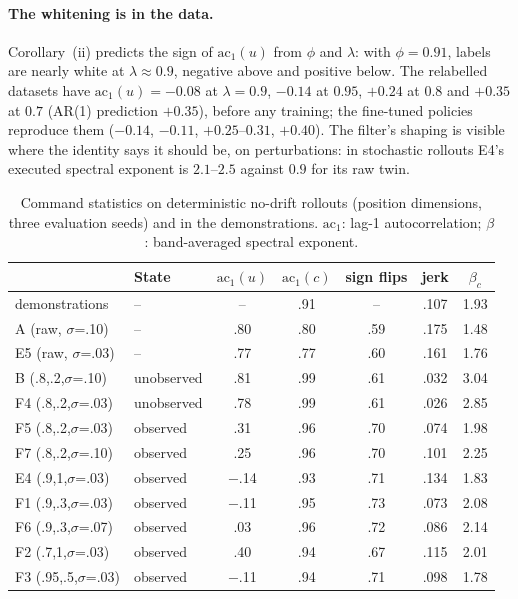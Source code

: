 \documentclass{article}
\begin{document}
\paragraph{The whitening is in the data.} Corollary~(ii) predicts the sign of $\mathrm{ac}_1(u)$ from $\phi$ and $\lambda$: with $\phi=0.91$, labels are nearly white at $\lambda\approx0.9$, negative above and positive below. The relabelled datasets have $\mathrm{ac}_1(u)=-0.08$ at $\lambda=0.9$, $-0.14$ at $0.95$, $+0.24$ at $0.8$ and $+0.35$ at $0.7$ (AR(1) prediction $+0.35$), before any training; the fine-tuned policies reproduce them ($-0.14$, $-0.11$, $+0.25$--$0.31$, $+0.40$). The filter's shaping is visible where the identity says it should be, on perturbations: in stochastic rollouts E4's executed spectral exponent is $2.1$--$2.5$ against $0.9$ for its raw twin.

\begin{table}[t]
\centering
\caption{Command statistics on deterministic no-drift rollouts (position dimensions, three evaluation seeds) and in the demonstrations. $\mathrm{ac}_1$: lag-1 autocorrelation; $\beta$: band-averaged spectral exponent.}
\label{tab:white}
\small
\begin{tabular}{l l cc c c c}
\toprule
& State & $\mathrm{ac}_1(u)$ & $\mathrm{ac}_1(c)$ & sign flips & jerk & $\beta_c$ \\
\midrule
demonstrations & -- & -- & .91 & -- & .107 & 1.93 \\
A (raw, $\sigma$=.10) & -- & .80 & .80 & .59 & .175 & 1.48 \\
E5 (raw, $\sigma$=.03) & -- & .77 & .77 & .60 & .161 & 1.76 \\
B (.8,.2,$\sigma$=.10) & unobserved & .81 & .99 & .61 & .032 & 3.04 \\
F4 (.8,.2,$\sigma$=.03) & unobserved & .78 & .99 & .61 & .026 & 2.85 \\
F5 (.8,.2,$\sigma$=.03) & observed & .31 & .96 & .70 & .074 & 1.98 \\
F7 (.8,.2,$\sigma$=.10) & observed & .25 & .96 & .70 & .101 & 2.25 \\
E4 (.9,1,$\sigma$=.03) & observed & $-$.14 & .93 & .71 & .134 & 1.83 \\
F1 (.9,.3,$\sigma$=.03) & observed & $-$.11 & .95 & .73 & .073 & 2.08 \\
F6 (.9,.3,$\sigma$=.07) & observed & .03 & .96 & .72 & .086 & 2.14 \\
F2 (.7,1,$\sigma$=.03) & observed & .40 & .94 & .67 & .115 & 2.01 \\
F3 (.95,.5,$\sigma$=.03) & observed & $-$.11 & .94 & .71 & .098 & 1.78 \\
\bottomrule
\end{tabular}
\end{table}
\end{document}
